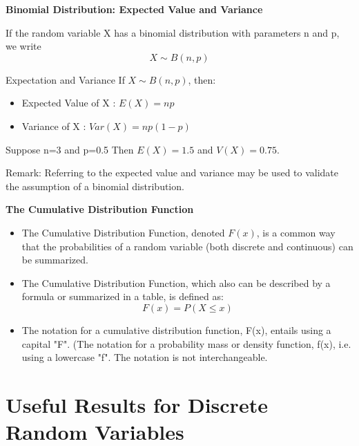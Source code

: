 {{}


{
\textbf{Binomial Distribution: Expected Value and Variance}


If the random variable X has a binomial distribution with parameters n
and p, we write
\[ X \sim B(n,p) \]

Expectation and Variance
If $X \sim B(n,p)$, then:

\begin{itemize}
\item  Expected Value of X : $E(X) = np$
\item  Variance of X : $Var(X) = np(1-p)$
\end{itemize}

Suppose n=3 and p=0.5 
Then $E(X) = 1.5$ and $V(X) = 0.75$.

Remark: Referring to the expected value and variance may be used to validate
the assumption of a binomial distribution.

}



\textbf{The Cumulative Distribution Function}
\begin{itemize}
\item  The Cumulative Distribution Function, denoted $F(x)$, is a common way that the probabilities
of a random variable (both discrete and continuous) can be summarized.
\item  The Cumulative Distribution Function, which also can be
described by a formula or summarized in a table, is defined as:
\[F(x) = P(X \leq x) \]
\item  The notation for a cumulative distribution function, F(x), entails using a capital
"F".  (The notation for a probability mass or density function, f(x), i.e. using a lowercase "f". The notation is not interchangeable.
\end{itemize}



\section{Useful Results for Discrete Random Variables}



}
